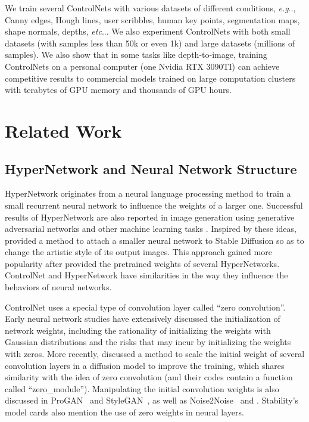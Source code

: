 \documentclass{article}
\makeatletter
\DeclareRobustCommand\onedot{\futurelet\@let@token\@onedot}
\def\@onedot{\ifx\@let@token.\else.\null\fi\xspace}
\def\eg{\emph{e.g}\onedot}
\def\etc{\emph{etc}\onedot}
\makeatother
\begin{document}
We train several ControlNets with various datasets of different conditions, \eg, Canny edges, Hough lines, user scribbles, human key points, segmentation maps, shape normals, depths, \etc. We also experiment ControlNets with both small datasets (with samples less than 50k or even 1k) and large datasets (millions of samples). We also show that in some tasks like depth-to-image, training ControlNets on a personal computer (one Nvidia RTX 3090TI) can achieve competitive results to commercial models trained on large computation clusters with terabytes of GPU memory and thousands of GPU hours.

\section{Related Work}

\subsection{HyperNetwork and Neural Network Structure}

HyperNetwork originates from a neural language processing method \cite{ha2017hypernetworks} to train a small recurrent neural network to influence the weights of a larger one. Successful results of HyperNetwork are also reported in image generation using generative adversarial networks \cite{alaluf2021hyperstyle, dinh2022hyperinverter} and other machine learning tasks \cite{shamsian2021personalized}. Inspired by these ideas, \cite{heathen} provided a method to attach a smaller neural network to Stable Diffusion \cite{rombach2021highresolution} so as to change the artistic style of its output images. This approach gained more popularity after \cite{nai} provided the pretrained weights of several HyperNetworks. ControlNet and HyperNetwork have similarities in the way they influence the behaviors of neural networks.

ControlNet uses a special type of convolution layer called ``zero convolution''. Early neural network studies \cite{726791,Rumelhart1986,LeCun2015} have extensively discussed the initialization of network weights, including the rationality of initializing the weights with Gaussian distributions and the risks that may incur by initializing the weights with zeros. More recently, \cite{2102.09672} discussed a method to scale the initial weight of several convolution layers in a diffusion model to improve the training, which shares similarity with the idea of zero convolution (and their codes contain a function called ``zero\_module''). Manipulating the initial convolution weights is also discussed in ProGAN~\cite{1710.10196} and StyleGAN~\cite{1812.04948}, as well as Noise2Noise~\cite{1803.04189} and \cite{DBLP:journals/corr/abs-2110-12661}. Stability's model cards \cite{sdd} also mention the use of zero weights in neural layers.
\end{document}
